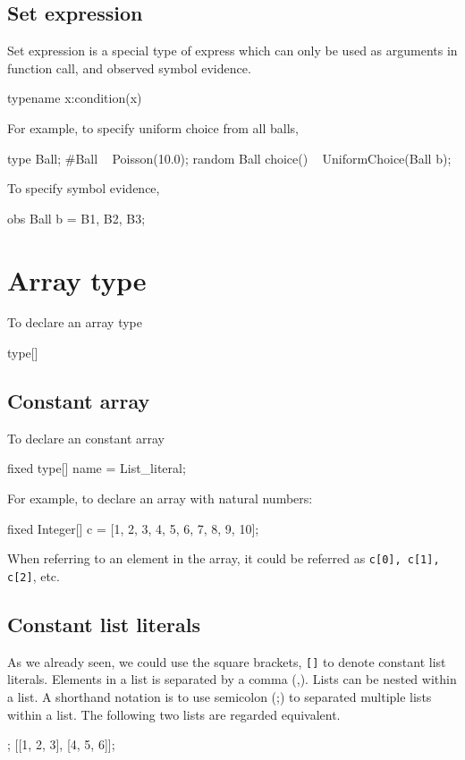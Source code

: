 \documentclass[12pt]{article}
\begin{document}
\subsection{Set expression}
Set expression is a special type of express which can only be used as arguments in function call, and observed symbol evidence. 
\begin{blogcode}
{typename x:condition(x)}
\end{blogcode}

For example, to specify uniform choice from all balls,
\begin{blogcode}
type Ball;
#Ball ~ Poisson(10.0);
random Ball choice() ~ UniformChoice({Ball b});
\end{blogcode}

To specify symbol evidence,
\begin{blogcode}
obs {Ball b} = {B1, B2, B3};
\end{blogcode}

\section{Array type}
To declare an array type
\begin{blogcode}
type[]
\end{blogcode}

\subsection{Constant array}
To declare an constant array
\begin{blogcode}
fixed type[] name = List_literal;
\end{blogcode}

For example, to declare an array with natural numbers:
\begin{blogcode}
fixed Integer[] c = [1, 2, 3, 4, 5, 6, 7, 8, 9, 10];
\end{blogcode}

When referring to an element in the array, it could be referred as \verb|c[0], c[1], c[2]|, etc.

\subsection{Constant list literals}
As we already seen, we could use the square brackets, \texttt{[]} to denote constant list literals.
Elements in a list is separated by a comma (,). Lists can be nested within a list. A shorthand notation is to use semicolon (;) to separated multiple lists within a list.
The following two lists are regarded equivalent.
\begin{blogcode}
[1, 2, 3; 4, 5, 6];
[[1, 2, 3], [4, 5, 6]];
\end{blogcode}
\end{document}
